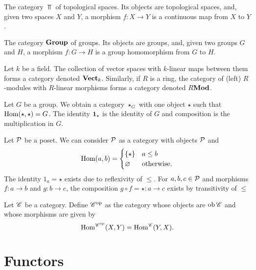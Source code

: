 \begin{example}
  The category $\Top$ of topological spaces.
  Its objects are topological spaces, and, given two spaces $X$ and $Y$, a morphism $f : X \to Y$ is a continuous map from $X$ to $Y$.
\end{example}

\begin{example}
  The category $\mathbf{Group}$ of groups.
  Its objects are groups, and, given two groups $G$ and $H$, a morphism $f : G \to H$ is a group homomorphism from $G$ to $H$.
\end{example}

\begin{example}
  Let $k$ be a field.
  The collection of vector spaces with $k$-linear maps between them forms a category denoted $\mathbf{Vect}_{k}$.
  Similarly, if $R$ is a ring, the category of (left) $R$-modules with $R$-linear morphisms forms a category denoted $R\mathbf{Mod}$.
\end{example}

\begin{example}
  Let $G$ be a group.
  We obtain a category $\star_{G}$ with one object $\star$ such that $\operatorname{Hom}(\star,\star) = G$.
  The identity $\mathbf{1}_{\star}$ is the identity of $G$ and composition is the multiplication in $G$.
\end{example}

\begin{example}
  Let $\mathcal{P}$ be a poset.
  We can consider $\mathcal{P}$ as a category with objects $\mathcal{P}$ and
  \[ \operatorname{Hom}(a,b) = \begin{cases}
      \{\star\} & a \le b \\
      \varnothing & \text{otherwise}.
    \end{cases}\]
  The identity $1_a=\star$ exists due to reflexivity of $\le$.  For $a,b,c\in \mathcal{P}$ and morphisms $f:a\to b$ and $g: b\to c$, the composition $g\circ f=\star: a\to c$ exists by transitivity of $\le$
\end{example}

\begin{example}
  Let $\mathscr{C}$ be a category.
  Define $\mathscr{C}^{\mathrm{op}}$ as the category whose objects are $\operatorname{ob} \mathscr{C}$ and whose morphisms are given by
  \[ \operatorname{Hom}^{\mathscr{C}^{\mathrm{op}}}(X,Y) = \operatorname{Hom}^{\mathscr{C}}(Y,X). \]
\end{example}

\section{Functors}

